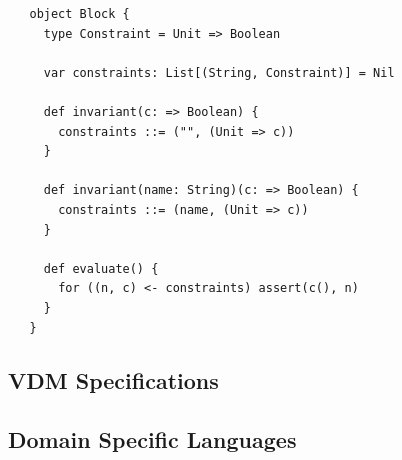 \scalaimpl
\begin{lstlisting}
   object Block {
     type Constraint = Unit => Boolean

     var constraints: List[(String, Constraint)] = Nil

     def invariant(c: => Boolean) {
       constraints ::= ("", (Unit => c))
     }

     def invariant(name: String)(c: => Boolean) {
       constraints ::= (name, (Unit => c))
     }

     def evaluate() {
       for ((n, c) <- constraints) assert(c(), n)
     }
   }
\end{lstlisting}


\subsection{VDM Specifications}
\label{sec:vdm-in-scala}

\subsection{Domain Specific Languages}
\label{sec:dsl-in-scala}


